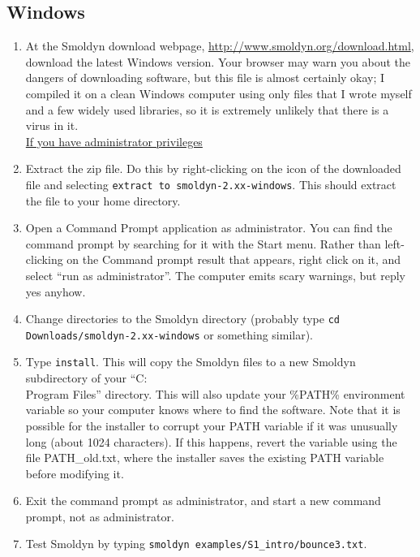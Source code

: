 \documentclass {scrbook}
\newcommand {\ttt} {\texttt}
\begin{document}
\subsection*{Windows}
\begin{enumerate}
\item At the Smoldyn download webpage, \url{http://www.smoldyn.org/download.html}, download the latest Windows version. Your browser may warn you about the dangers of downloading software, but this file is almost certainly okay; I compiled it on a clean Windows computer using only files that I wrote myself and a few widely used libraries, so it is extremely unlikely that there is a virus in it.\\

\underline{If you have administrator privileges}
\item Extract the zip file. Do this by right-clicking on the icon of the downloaded file and selecting \ttt{extract to smoldyn-2.xx-windows}. This should extract the file to your home directory.
\item Open a Command Prompt application as administrator. You can find the command prompt by searching for it with the Start menu. Rather than left-clicking on the Command prompt result that appears, right click on it, and select ``run as administrator''. The computer emits scary warnings, but reply yes anyhow.
\item Change directories to the Smoldyn directory (probably type \ttt{cd Downloads/smoldyn-2.xx-windows} or something similar).
\item Type \ttt{install}. This will copy the Smoldyn files to a new Smoldyn subdirectory of your ``C:\\Program Files'' directory. This will also update your \%PATH\% environment variable so your computer knows where to find the software. Note that it is possible for the installer to corrupt your PATH variable if it was unusually long (about 1024 characters). If this happens, revert the variable using the file PATH\_old.txt, where the installer saves the existing PATH variable before modifying it.
\item Exit the command prompt as administrator, and start a new command prompt, not as administrator.
\item Test Smoldyn by typing \ttt{smoldyn examples/S1\_intro/bounce3.txt}.\\


\end{enumerate}
\end{document}

